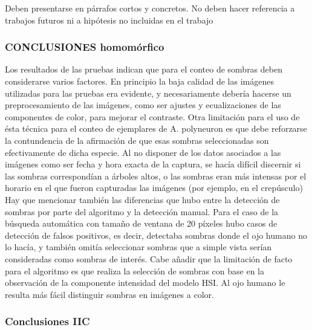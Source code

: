 Deben presentarse en párrafos cortos y concretos. No deben hacer referencia a trabajos futuros ni a hipótesis no incluidas en el trabajo

\subsubsection{CONCLUSIONES homomórfico}
Los resultados de las pruebas indican que para el conteo de sombras deben considerarse varios factores. En principio la baja calidad de las imágenes utilizadas para las pruebas era evidente, y necesariamente debería hacerse un preprocesamiento de las imágenes, como ser ajustes y ecualizaciones de las componentes de color, para mejorar el contraste. Otra limitación para el uso de ésta técnica para el conteo de ejemplares de A. polyneuron es que debe reforzarse la contundencia de la afirmación de que esas sombras seleccionadas son efectivamente de dicha especie. Al no disponer de los datos asociados a las imágenes como ser fecha y hora exacta de la captura, se hacía difícil discernir si las sombras correspondían a árboles altos, o las sombras eran más intensas por el horario en el que fueron capturadas las imágenes (por ejemplo, en el crepúsculo) Hay que mencionar también las diferencias que hubo entre la detección de sombras por parte del algoritmo y la detección manual. Para el caso de la búsqueda automática con tamaño de ventana de 20 píxeles hubo casos de detección de falsos positivos, es decir, detectaba sombras donde el ojo humano no lo hacía, y también omitía seleccionar sombras que a simple vista serían consideradas como sombras de interés. Cabe añadir que la limitación de facto para el algoritmo es que realiza la selección de sombras con base en la observación de la componente intensidad del modelo HSI. Al ojo humano le resulta más fácil distinguir sombras en imágenes a color.

\subsubsection{Conclusiones IIC} \label{Conclusiones}

